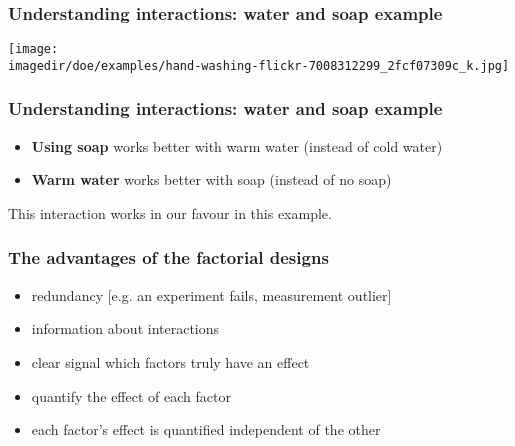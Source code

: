 \documentclass[handout,11pt,aspectratio=169,mathserif]{beamer}
\begin{document}
\begin{frame}\frametitle{Understanding interactions: water and soap example}
	\begin{center}
		\texttt{[image: \\imagedir/doe/examples/hand-washing-flickr-7008312299\_2fcf07309c\_k.jpg]}
	\end{center}
	\vspace{-4cm}
\end{frame}
\begin{frame}\frametitle{Understanding interactions: water and soap example}
	
	\large
	\begin{itemize}
		\item	\textbf{Using soap} works better with warm water (instead of cold water)

		
		\vspace{24pt}
		\item	\textbf{Warm water} works better with soap (instead of no soap)
			
	\end{itemize}

	\vspace{24pt}
	This interaction works in our favour in this example.
\end{frame}
\begin{frame}\frametitle{The advantages of the factorial designs}
	\begin{itemize}
		\item	redundancy [e.g. an experiment fails, measurement outlier]
		
		\item	information about interactions
		
		\item	clear signal which factors truly have an effect 
		
		\item	quantify the effect of each factor
		
		\item 	each factor's effect is quantified independent of the other
	\end{itemize}
\end{frame}
\end{document}
